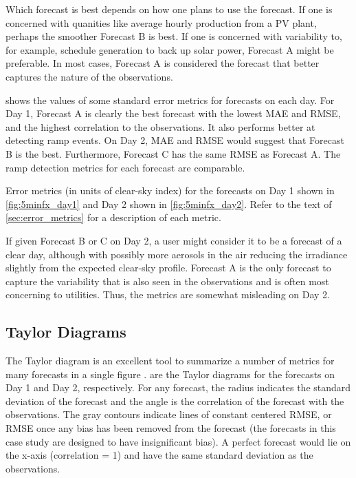 Which forecast is best depends on how one plans to use the forecast.
If one is concerned with quanities like average hourly production from
a PV plant, perhaps the smoother Forecast B is best.
If one is concerned with variability to, for example, schedule
generation to back up solar power, Forecast A might be preferable.
In most cases, Forecast A is considered the forecast that better
captures the nature of the observations.

 shows the values of some standard error metrics
for forecasts on each day.
For Day 1, Forecast A is clearly the best forecast with the lowest
MAE and RMSE, and the highest correlation to the observations.
It also performs better at detecting ramp events.
On Day 2, MAE and RMSE would suggest that Forecast B is the best.
Furthermore, Forecast C has the same RMSE as Forecast A.
The ramp detection metrics for each forecast are comparable.

\begin{table}[tbp]
\centering
\caption[Error metrics for contrived test forecasts]{Error metrics (in units
of clear-sky index) for the forecasts on Day 1 shown in
\cref{fig:5minfx_day1} and Day 2 shown in
\cref{fig:5minfx_day2}. Refer to the text of \cref{sec:error_metrics}
for a description of each metric.}
\label{table:fx_errs}
\vspace{.3em}
\captionsetup{position=top}
\hspace{3em}
\end{table}

If given Forecast B or C on Day 2, a user might consider it to be a
forecast of a clear day, although with possibly more aerosols in the
air reducing the irradiance slightly from the expected clear-sky
profile.
Forecast A is the only forecast to capture the variability that is
also seen in the observations and is often most concerning to
utilities.
Thus, the metrics are somewhat misleading on Day 2.

\subsection{Taylor Diagrams}
The Taylor diagram is an excellent tool to summarize a number of
metrics for many forecasts in a single figure \citep{Taylor2001}.
 are the Taylor diagrams for the
forecasts on Day 1 and Day 2, respectively.
For any forecast, the radius indicates the standard deviation of the
forecast and the angle is the correlation of the forecast with the
observations.
The gray contours indicate lines of constant centered RMSE, or RMSE
once any bias has been removed from the forecast (the forecasts in
this case study are designed to have insignificant bias).
A perfect forecast would lie on the x-axis (correlation = 1) and have
the same standard deviation as the observations.

